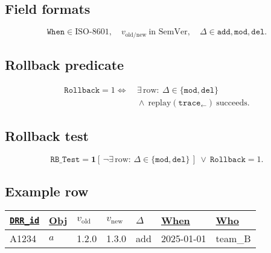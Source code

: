 \documentclass[conference]{IEEEtran}
\newcommand{\iverson}[1]{\mathbf{1}\!\left[#1\right]}
\begin{document}
\subsection{Field formats}
\begin{equation}
\label{eq:chlog-formats}
\mathtt{When}\in\text{ISO-8601},\quad
v_{\mathrm{old/new}}\ \text{in SemVer},\quad
\Delta\in{\mathtt{add},\mathtt{mod},\mathtt{del}}.
\end{equation}

\subsection{Rollback predicate}
\begin{equation}
\label{eq:rollback}
\begin{aligned}
\mathtt{Rollback}=1 \iff\ & \exists\,\text{row}:\ \Delta\in\{\mathtt{mod},\mathtt{del}\}\\
&{}\wedge\ \mathrm{replay}\!\left(\mathtt{trace}_{\leftarrow}\right)\ \text{succeeds}.
\end{aligned}
\end{equation}

\subsection{Rollback test}
\begin{equation}
\label{eq:rb-test}
\mathtt{RB\_Test}
=\iverson{\,\neg\exists\,\text{row: }\Delta\!\in\!\{\mathtt{mod},\mathtt{del}\}\,}\ \lor\ \mathtt{Rollback}=1.
\end{equation}

\subsection{Example row}
\begin{table}[!htb]
\centering
\setlength{\tabcolsep}{2pt}        %
\renewcommand{\arraystretch}{1.02} %
\begin{tabular}{p{.14\linewidth}p{.10\linewidth}p{.10\linewidth}p{.10\linewidth}p{.08\linewidth}p{.16\linewidth}p{.16\linewidth}}
\underline{\texttt{DRR\_id}} & \underline{Obj} & \underline{$v_{\mathrm{old}}$} & \underline{$v_{\mathrm{new}}$} & \underline{$\Delta$} & \underline{When} & \underline{Who} \\
\hline
A1234 & $a$ & 1.2.0 & 1.3.0 & add & 2025-01-01 & team\_B \\
\end{tabular}
\end{table}
\end{document}
